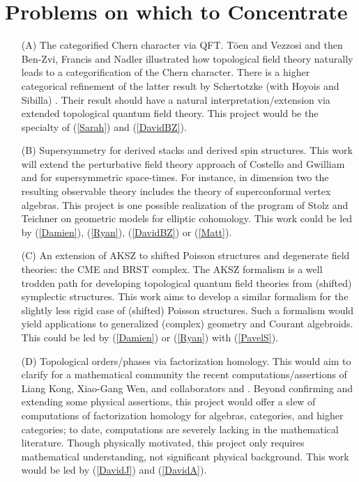 \documentclass[11pt]{amsart}
\begin{document}
\section*{Problems on which to Concentrate}

\begin{itemize}
\item[(A)] The categorified Chern character via QFT.  T\"oen and Vezzosi \cite{TV1} and then Ben-Zvi, Francis and Nadler \cite{BFN} illustrated how topological field theory naturally leads to a categorification of the Chern character.  There is a higher categorical refinement of the latter result by Schertotzke (with Hoyois and Sibilla) \cite{HSS}.  Their result should have a natural interpretation/extension via extended topological quantum field theory. This project would be the specialty of (\ref{Sarah}) and (\ref{DavidBZ}).

\item[(B)] Supersymmetry for derived stacks and derived spin structures. 
This work will extend the perturbative field theory approach of Costello and Gwilliam \cite{CG1} and \cite{CG2}  for supersymmetric space-times. For instance, in dimension two the resulting observable theory includes the theory of superconformal vertex algebras. This project is one possible realization of the program of Stolz and Teichner on geometric models for elliptic cohomology.
This work could be led by (\ref{Damien}), (\ref{Ryan}), (\ref{DavidBZ}) or (\ref{Matt}).  
\item[(C)] An extension of AKSZ to shifted Poisson structures and degenerate field theories: the CME and BRST complex. The AKSZ formalism \cite{AKSZ} is a well trodden path for developing topological quantum field theories from (shifted) symplectic structures. This work aims to develop a similar formalism for the slightly less rigid case of (shifted) Poisson structures.
Such a formalism would yield applications to generalized (complex) geometry and Courant algebroids. 
This could be led by (\ref{Damien}) or (\ref{Ryan}) with (\ref{PavelS}).
\item[(D)] Topological orders/phases via factorization homology. 
This would aim to clarify for a mathematical community the recent computations/assertions of Liang Kong, Xiao-Gang Wen, and collaborators \cite{KW1} and \cite{KW2}. Beyond confirming and extending some physical assertions, this project would offer a slew of computations of factorization homology for algebras, categories, and higher categories; to date, computations are severely lacking in the mathematical literature. Though physically motivated, this project only requires mathematical understanding, not significant physical background. This work would be led by (\ref{DavidJ}) and  (\ref{DavidA}).

\end{itemize}
\end{document}

